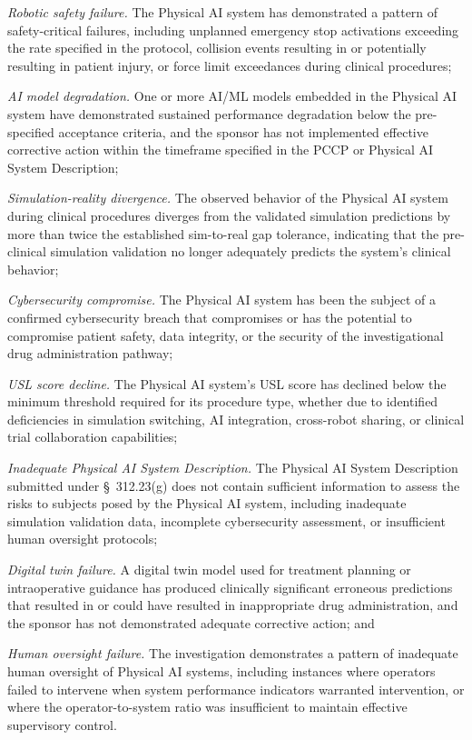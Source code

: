 \begin{description}[leftmargin=0.8cm,style=sameline]
\item[(i)] \textit{Robotic safety failure.} The Physical AI system has demonstrated a pattern of safety-critical failures, including unplanned emergency stop activations exceeding the rate specified in the protocol, collision events resulting in or potentially resulting in patient injury, or force limit exceedances during clinical procedures;
\item[(ii)] \textit{AI model degradation.} One or more AI/ML models embedded in the Physical AI system have demonstrated sustained performance degradation below the pre-specified acceptance criteria, and the sponsor has not implemented effective corrective action within the timeframe specified in the PCCP or Physical AI System Description;
\item[(iii)] \textit{Simulation-reality divergence.} The observed behavior of the Physical AI system during clinical procedures diverges from the validated simulation predictions by more than twice the established sim-to-real gap tolerance, indicating that the pre-clinical simulation validation no longer adequately predicts the system's clinical behavior;
\item[(iv)] \textit{Cybersecurity compromise.} The Physical AI system has been the subject of a confirmed cybersecurity breach that compromises or has the potential to compromise patient safety, data integrity, or the security of the investigational drug administration pathway;
\item[(v)] \textit{USL score decline.} The Physical AI system's USL score has declined below the minimum threshold required for its procedure type, whether due to identified deficiencies in simulation switching, AI integration, cross-robot sharing, or clinical trial collaboration capabilities;
\item[(vi)] \textit{Inadequate Physical AI System Description.} The Physical AI System Description submitted under \S~312.23(g) does not contain sufficient information to assess the risks to subjects posed by the Physical AI system, including inadequate simulation validation data, incomplete cybersecurity assessment, or insufficient human oversight protocols;
\item[(vii)] \textit{Digital twin failure.} A digital twin model used for treatment planning or intraoperative guidance has produced clinically significant erroneous predictions that resulted in or could have resulted in inappropriate drug administration, and the sponsor has not demonstrated adequate corrective action; and
\item[(viii)] \textit{Human oversight failure.} The investigation demonstrates a pattern of inadequate human oversight of Physical AI systems, including instances where operators failed to intervene when system performance indicators warranted intervention, or where the operator-to-system ratio was insufficient to maintain effective supervisory control.
\end{description}

